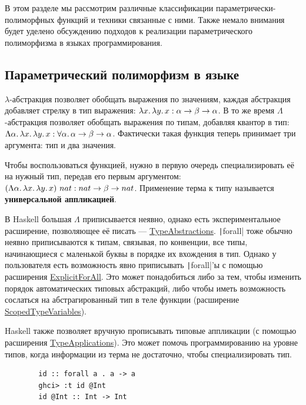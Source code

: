 \documentclass[12pt]{article}
\newcommand{\vocab}[1]{\textbf{#1}} %
\newcommand{\ap}{~}
\begin{document}
    В этом разделе мы рассмотрим различные классификации параметрически-полиморфных функций и техники связанные с ними.
    Также немало внимания будет уделено обсуждению подходов к реализации параметрического полиморфизма в языках программирования.

    \subsection{Параметрический полиморфизм в языке}

    $\lambda$-абстракция позволяет обобщать выражения по значениям, каждая абстракция добавляет стрелку в тип выражения: $\lambda x\ldotp \lambda y\ldotp x : \alpha\to\beta\to\alpha$.
    В то же время $\Lambda$-абстракция позволяет обобщать выражения по типам, добавляя квантор в тип: $\Lambda \alpha\ldotp\lambda x\ldotp \lambda y\ldotp x : \forall \alpha\ldotp \alpha\to\beta\to\alpha$.
    Фактически такая функция теперь принимает три аргумента: тип и два значения.

    Чтобы воспользоваться функцией, нужно в первую очередь специализировать её на нужный тип, передав его первым аргументом: $(\Lambda \alpha\ldotp\lambda x\ldotp \lambda y\ldotp x)\ap nat : nat\to\beta\to nat$.
    Применение терма к типу называется \vocab{универсальной аппликацией}.

    В Haskell большая $\Lambda$ приписывается неявно, однако есть экспериментальное расширение, позволяющее её писать --- \href{https://downloads.haskell.org/ghc/latest/docs/users_guide/exts/type_abstractions.html}{TypeAbstractions}.
    \texttt|forall| тоже обычно неявно приписываются к типам, связывая, по конвенции, все типы, начинающиеся с маленькой буквы в порядке их вхождения в тип.
    Однако у пользователя есть возможность явно приписывать \texttt|forall|'ы с помощью расширения \href{https://downloads.haskell.org/ghc/latest/docs/users_guide/exts/explicit_forall.html\#extension-ExplicitForAll}{ExplicitForAll}.
    Это может понадобиться либо за тем, чтобы изменить порядок автоматических типовых абстракций, либо чтобы иметь возможность сослаться на абстрагированный тип в теле функции (расширение \href{https://downloads.haskell.org/ghc/latest/docs/users_guide/exts/scoped_type_variables.html#extension-ScopedTypeVariables}{ScopedTypeVariables}).

    Haskell также позволяет вручную прописывать типовые аппликации (с помощью расширения \href{https://downloads.haskell.org/ghc/latest/docs/users_guide/exts/type_applications.html}{TypeApplications}).
    Это может помочь программированию на уровне типов, когда информации из терма не достаточно, чтобы специализировать тип.
    \begin{verbatim}
        id :: forall a . a -> a
        ghci> :t id @Int
        id @Int :: Int -> Int
    \end{verbatim}
\end{document}
